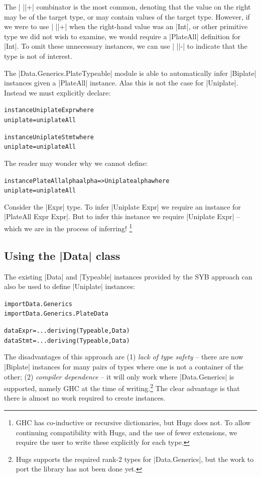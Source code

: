 \documentclass[preprint]{sigplanconf}
\newenvironment{code}{\begin{alltt}\small}{\end{alltt}}
\newcommand{\ignore}{}
\begin{document}
The | ||+| combinator is the most common, denoting that the value on the right may be of the target type, or may contain values of the target type. However, if we were to use | ||+| when the right-hand value was an |Int|, or other primitive type we did not wish to examine, we would require a |PlateAll| definition for |Int|. To omit these unnecessary instances, we can use | ||-| to indicate that the type is not of interest.

The |Data.Generics.PlateTypeable| module is able to automatically infer |Biplate| instances given a |PlateAll| instance. Alas this is not the case for |Uniplate|. Instead we must explicitly declare:

\begin{code}
instance Uniplate Expr where
    uniplate = uniplateAll

instance Uniplate Stmt where
    uniplate = uniplateAll
\end{code}

The reader may wonder why we cannot define:

\begin{code}
instance PlateAll alpha alpha => Uniplate alpha where
    uniplate = uniplateAll
\end{code}

Consider the |Expr| type. To infer \ignore|Uniplate Expr| we require an instance for \ignore|PlateAll Expr Expr|. But to infer this instance we require \ignore|Uniplate Expr| -- which we are in the process of inferring! \footnote{GHC has co-inductive or recursive dictionaries, but Hugs does not. To allow continuing compatibility with Hugs, and the use of fewer extensions, we require the user to write these explicitly for each type.}


\subsection{Using the |Data| class}
\label{sec:implement_playdata}

The existing |Data| and |Typeable| instances provided by the SYB approach can also be used to define |Uniplate| instances:

\ignore\begin{code}
import Data.Generics
import Data.Generics.PlateData

data Expr  = ... \? \? deriving (Typeable, Data)
data Stmt  = ... \? \? deriving (Typeable, Data)
\end{code}

The disadvantages of this approach are (1) \textit{lack of type safety} -- there are now |Biplate| instances for many pairs of types where one is not a container of the other; (2) \textit{compiler dependence} -- it will only work where |Data.Generics| is supported, namely GHC at the time of writing.\footnote{Hugs supports the required rank-2 types for |Data.Generics|, but the work to port the library has not been done yet.} The clear advantage is that there is almost no work required to create instances.
\end{document}

